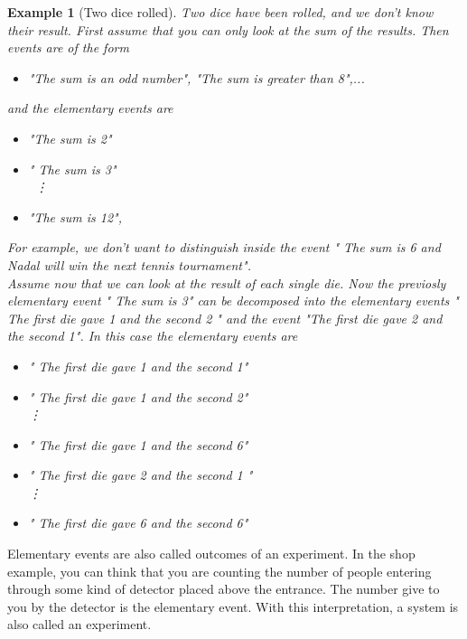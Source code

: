 \documentclass[12pt]{article}
\newtheorem{example}[theorem]{Example}
\newcommand{\<}{{\langle \!\! \langle}}
\renewcommand{\>}{{\rangle \!\! \rangle}}
\newcommand{\commento}[1]{
	\par\noindent
	\colorbox{light}{\begin{minipage}{120 mm}#1\end{minipage}}
	\par\noindent
}
\begin{document}
\begin{example}[Two dice rolled]
Two dice have been rolled, and we don't know their result. First assume that you can only look at the sum of the results.  Then events are of the form 
\begin{itemize}

	\item "The sum is an odd number", "The sum is greater than 8",...

\end{itemize}
and the elementary events are 

\begin{itemize}

	\item "The sum is 2" \\
	\item " The sum is 3"\\ \
		\vdots
	\item "The sum is 12",

\end{itemize}
 For example, we don't want to distinguish inside the event " The sum is 6 and Nadal will win the next tennis tournament". \\
 
Assume now that we can look at the result of each single die. Now the previosly elementary event " The sum is 3" can be decomposed into the elementary events " The first die gave 1 and the second 2 " and the event "The first die gave 2 and the second 1". 
In this case the elementary events are
\begin{itemize}

	\item " The first die gave 1 and the second 1"\\
	\item " The first die gave 1 and the second 2"\\
	\vdots
	\item  " The first die gave 1 and the second 6" \\
	\item " The first die gave 2 and the second 1 "\\
	\vdots
	\item " The first die gave 6 and the second 6"   
\end{itemize}

\end{example} 

\commento{ Elementary events are also called outcomes of an experiment. In the shop example, you can think that you are counting the number of people entering through some kind of detector placed above the entrance. The number give to you by the detector is the elementary event. With this interpretation, a system is also called an experiment. }
\end{document}
